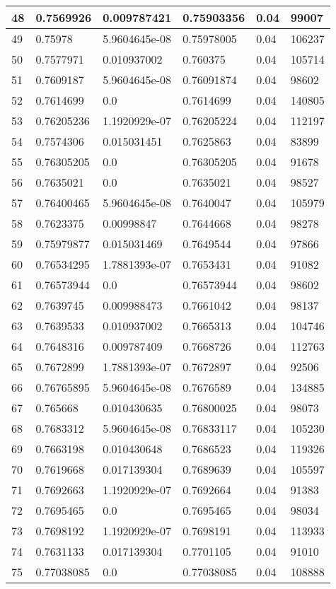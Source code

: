 \begin{longtable}{|l|l|l|l|l|l|}
48 & 0.7569926 & 0.009787421 & 0.75903356 & 0.04 & 99007 \\ \hline 
49 & 0.75978 & 5.9604645e-08 & 0.75978005 & 0.04 & 106237 \\ \hline 
50 & 0.7577971 & 0.010937002 & 0.760375 & 0.04 & 105714 \\ \hline 
51 & 0.7609187 & 5.9604645e-08 & 0.76091874 & 0.04 & 98602 \\ \hline 
52 & 0.7614699 & 0.0 & 0.7614699 & 0.04 & 140805 \\ \hline 
53 & 0.76205236 & 1.1920929e-07 & 0.76205224 & 0.04 & 112197 \\ \hline 
54 & 0.7574306 & 0.015031451 & 0.7625863 & 0.04 & 83899 \\ \hline 
55 & 0.76305205 & 0.0 & 0.76305205 & 0.04 & 91678 \\ \hline 
56 & 0.7635021 & 0.0 & 0.7635021 & 0.04 & 98527 \\ \hline 
57 & 0.76400465 & 5.9604645e-08 & 0.7640047 & 0.04 & 105979 \\ \hline 
58 & 0.7623375 & 0.00998847 & 0.7644668 & 0.04 & 98278 \\ \hline 
59 & 0.75979877 & 0.015031469 & 0.7649544 & 0.04 & 97866 \\ \hline 
60 & 0.76534295 & 1.7881393e-07 & 0.7653431 & 0.04 & 91082 \\ \hline 
61 & 0.76573944 & 0.0 & 0.76573944 & 0.04 & 98602 \\ \hline 
62 & 0.7639745 & 0.009988473 & 0.7661042 & 0.04 & 98137 \\ \hline 
63 & 0.7639533 & 0.010937002 & 0.7665313 & 0.04 & 104746 \\ \hline 
64 & 0.7648316 & 0.009787409 & 0.7668726 & 0.04 & 112763 \\ \hline 
65 & 0.7672899 & 1.7881393e-07 & 0.7672897 & 0.04 & 92506 \\ \hline 
66 & 0.76765895 & 5.9604645e-08 & 0.7676589 & 0.04 & 134885 \\ \hline 
67 & 0.765668 & 0.010430635 & 0.76800025 & 0.04 & 98073 \\ \hline 
68 & 0.7683312 & 5.9604645e-08 & 0.76833117 & 0.04 & 105230 \\ \hline 
69 & 0.7663198 & 0.010430648 & 0.7686523 & 0.04 & 119326 \\ \hline 
70 & 0.7619668 & 0.017139304 & 0.7689639 & 0.04 & 105597 \\ \hline 
71 & 0.7692663 & 1.1920929e-07 & 0.7692664 & 0.04 & 91383 \\ \hline 
72 & 0.7695465 & 0.0 & 0.7695465 & 0.04 & 98034 \\ \hline 
73 & 0.7698192 & 1.1920929e-07 & 0.7698191 & 0.04 & 113933 \\ \hline 
74 & 0.7631133 & 0.017139304 & 0.7701105 & 0.04 & 91010 \\ \hline 
75 & 0.77038085 & 0.0 & 0.77038085 & 0.04 & 108888 \\ \hline 
\end{longtable}